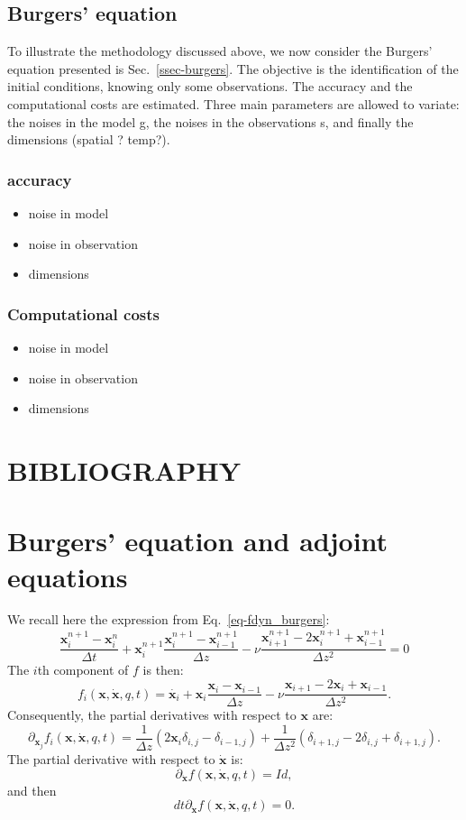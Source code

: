\documentclass[aip,pof,nofootinbib,reprint,onecolumn]{revtex4-1}
\newcommand{\gras}[1]{\boldsymbol{#1}}
\newcommand{\mypar}[1]{\left(#1\right)}
\newcommand{\fdyn}{f} %
\newcommand{\point}{\gras{x}} %
\begin{document}
%

\subsection{Burgers' equation}  \label{ssec-results-burgers}
To illustrate the methodology discussed above, we now consider the Burgers' equation presented is Sec.~\ref{ssec-burgers}.
The objective is the identification of the initial conditions, knowing only some observations. 
The accuracy and the computational costs are estimated. 
Three main parameters are allowed to variate: the noises in the model g, the noises in the observations s, and finally the dimensions (spatial ? temp?).

\subsubsection{accuracy}
\begin{itemize}
\item noise in model
\item noise in observation
\item dimensions
\end{itemize}
\subsubsection{Computational costs}
\begin{itemize}
\item noise in model
\item noise in observation
\item dimensions
\end{itemize}



\section*{BIBLIOGRAPHY}


\appendix
\section{Burgers' equation and adjoint equations}
\label{an-burgers}
We recall here the expression from Eq.~\eqref{eq-fdyn_burgers}:
$$ \frac{\point^{n+1}_i - \point^{n}_i}{\Delta t} + \point^{n+1}_i \frac{\point^{n+1}_i - \point^{n+1}_{i-1}}{\Delta z} - \nu \frac{\point^{n+1}_{i+1} -2 \point^{n+1}_i + \point^{n+1}_{i-1}}{\Delta z ^2} = 0 $$
The $i$th component of $\fdyn$ is then:
$$\fdyn_i\mypar{\point,\dot{\point},q,t} = \dot{\point_i} + \point_i \frac{\point_i - \point_{i-1}}{\Delta z} - \nu \frac{\point_{i+1} -2 \point_i + \point_{i-1}}{\Delta z ^2}. $$
Consequently, the partial derivatives with respect to $\point$ are:
$$\partial_{\point_j} \fdyn_i\mypar{\point,\dot{\point},q,t} = \frac{1}{\Delta z }\mypar{2 \point_i \delta_{i,j} - \delta_{i-1,j}} + \frac{1}{\Delta z ^2}\mypar{\delta_{i+1,j} - 2 \delta_{i,j} + \delta_{i+1,j}}.$$
The partial derivative with respect to $\dot{\point}$ is:
$$\partial_{\dot{\point}} \fdyn\mypar{\point,\dot{\point},q,t}  = Id,$$
and then $$dt\partial_{\dot{\point}} \fdyn\mypar{\point,\dot{\point},q,t}  = 0. $$
\end{document}
